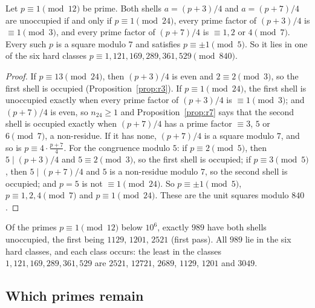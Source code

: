 \begin{proposition}\label{prop:survivors}
Let $p\equiv1\pmod{12}$ be prime. Both shells $a=(p+3)/4$ and $a=(p+7)/4$ are unoccupied if and only if $p\equiv1\pmod{24}$, every prime factor of $(p+3)/4$ is $\equiv1\pmod3$, and every prime factor of $(p+7)/4$ is $\equiv1,2$ or $4\pmod7$. Every such $p$ is a square modulo $7$ and satisfies $p\equiv\pm1\pmod5$. So it lies in one of the six hard classes $p\equiv1,121,169,289,361,529\pmod{840}$.
\end{proposition}
\begin{proof}
If $p\equiv13\pmod{24}$, then $(p+3)/4$ is even and $2\equiv2\pmod3$, so the first shell is occupied (Proposition~\ref{prop:r3}). If $p\equiv1\pmod{24}$, the first shell is unoccupied exactly when every prime factor of $(p+3)/4$ is $\equiv1\pmod3$; and $(p+7)/4$ is even, so $n_{24}\ge1$ and Proposition~\ref{prop:r7} says that the second shell is occupied exactly when $(p+7)/4$ has a prime factor $\equiv3$, $5$ or $6\pmod7$, a non-residue. If it has none, $(p+7)/4$ is a square modulo $7$, and so is $p\equiv4\cdot\frac{p+7}4$.
For the congruence modulo $5$: if $p\equiv2\pmod5$, then $5\mid(p+3)/4$ and $5\equiv2\pmod3$, so the first shell is occupied; if $p\equiv3\pmod5$, then $5\mid(p+7)/4$ and $5$ is a non-residue modulo $7$, so the second shell is occupied; and $p=5$ is not $\equiv1\pmod{24}$. So $p\equiv\pm1\pmod5$, $p\equiv1,2,4\pmod7$ and $p\equiv1\pmod{24}$. These are the unit squares modulo $840$.
\end{proof}
Of the primes $p\equiv1\pmod{12}$ below $10^6$, exactly $989$ have both shells unoccupied, the first being $1129$, $1201$, $2521$ (first pass). All $989$ lie in the six hard classes, and each class occurs: the least in the classes $1,121,169,289,361,529$ are $2521$, $12721$, $2689$, $1129$, $1201$ and $3049$.

\subsection{Which primes remain}

